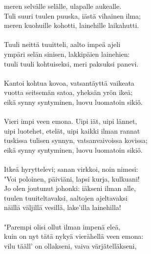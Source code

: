 meren selvälle selälle, ulapalle aukealle.                  \\
Tuli suuri tuulen puuska, iästä vihainen ilma;              \\
meren kuohuille kohotti, lainehille laikahutti.             \\
                                                            \\
Tuuli neittä tuuitteli, aalto impeä ajeli                   \\
ympäri selän sinisen, lakkipäien lainehien:                 \\
tuuli tuuli kohtuiseksi, meri paksuksi panevi.              \\
                                                            \\
Kantoi kohtua kovoa, vatsantäyttä vaikeata                  \\
vuotta seitsemän satoa, yheksän yrön ikeä;                  \\
eikä synny syntyminen, luovu luomatoin sikiö.               \\
                                                            \\
Vieri impi veen emona. Uipi iät, uipi lännet,               \\
uipi luotehet, etelät, uipi kaikki ilman rannat             \\
tuskissa tulisen synnyn, vatsanvaivoissa kovissa;           \\
eikä synny syntyminen, luovu luomatoin sikiö.               \\
                                                            \\
Itkeä hyryttelevi; sanan virkkoi, noin nimesi:              \\
"Voi poloinen, päiviäni, lapsi kurja, kulkuani!             \\
Jo olen joutunut johonki: iäkseni ilman alle,               \\
tuulen tuuiteltavaksi, aaltojen ajeltavaksi                 \\
näillä väljillä vesillä, lake'illa lainehilla!              \\
                                                            \\
"Parempi olisi ollut ilman impenä eleä,                     \\
kuin on nyt tätä nykyä vierähellä veen emona:               \\
vilu tääll' on ollakseni, vaiva värjätelläkseni,            \\
